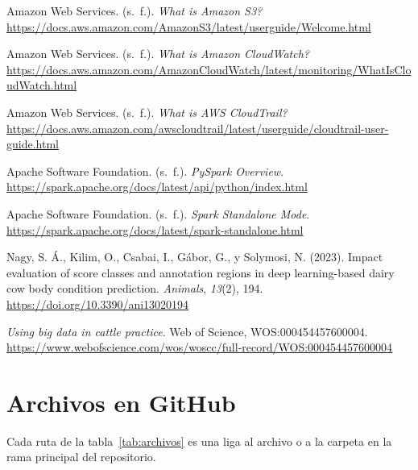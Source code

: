 \documentclass[11pt,letterpaper,DIV=12]{scrartcl}
\begin{document}
\begin{list}{}{\setlength{\leftmargin}{2em}\setlength{\itemindent}{-2em}\setlength{\itemsep}{0.5ex}}
\item Amazon Web Services. (s.~f.). \emph{What is Amazon S3?} \url{https://docs.aws.amazon.com/AmazonS3/latest/userguide/Welcome.html}
\item Amazon Web Services. (s.~f.). \emph{What is Amazon CloudWatch?} \url{https://docs.aws.amazon.com/AmazonCloudWatch/latest/monitoring/WhatIsCloudWatch.html}
\item Amazon Web Services. (s.~f.). \emph{What is AWS CloudTrail?} \url{https://docs.aws.amazon.com/awscloudtrail/latest/userguide/cloudtrail-user-guide.html}
\item Apache Software Foundation. (s.~f.). \emph{PySpark Overview}. \url{https://spark.apache.org/docs/latest/api/python/index.html}
\item Apache Software Foundation. (s.~f.). \emph{Spark Standalone Mode}. \url{https://spark.apache.org/docs/latest/spark-standalone.html}
\item Nagy, S. Á., Kilim, O., Csabai, I., Gábor, G., y Solymosi, N. (2023). Impact evaluation of score classes and annotation regions in deep learning-based dairy cow body condition prediction. \emph{Animals}, \emph{13}(2), 194. \url{https://doi.org/10.3390/ani13020194}
\item \emph{Using big data in cattle practice}. Web of Science, WOS:000454457600004. \url{https://www.webofscience.com/wos/woscc/full-record/WOS:000454457600004}
\end{list}

\appendix
\section{Archivos en GitHub}\label{sec:anexo}

Cada ruta de la tabla~\ref{tab:archivos} es una liga al archivo o a la carpeta en la rama principal del repositorio.
\end{document}
